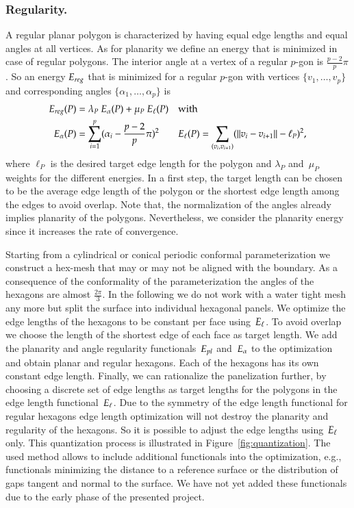 \documentclass[Thesis.tex]{subfiles}
\begin{document}
\subsubsection{Regularity.}
A regular planar polygon is characterized by having equal edge lengths
and equal angles at all vertices. As for planarity we define an energy
that is minimized in case of regular polygons. The interior angle at a
vertex of a regular $p$-gon is $\tfrac{p-2}{p} \pi$. So an energy $E_{reg}$
that is minimized for a regular $p$-gon with vertices $\{v_1, \ldots,
v_p\}$ and corresponding angles $\{\alpha_1, \ldots, \alpha_p\}$ is
\begin{align*}
E_{reg}(P) &= \lambda_P\  E_\alpha(P) + \mu_P\ E_\ell(P) &&\text{with}\\ 
E_\alpha(P) &= \sum_{i=1}^p (\alpha_i - \frac{p-2}{p} \pi)^2 
&& E_\ell(P) = \sum_{(v_i,v_{i+1})} (\|v_i - v_{i+1}\| - \ell_P)^2,
\end{align*}
where $\ell_P$ is the desired target edge length for the polygon and
$\lambda_P$ and~$\mu_P$ weights for the different energies. In a first
step, the target length can be chosen to be the average edge length of
the polygon or the shortest edge length among the edges to avoid
overlap.  Note that, the normalization of the angles already implies
planarity of the polygons.  Nevertheless, we consider the planarity
energy since it increases the rate of convergence.

Starting from a cylindrical or conical periodic conformal
parameterization we construct a hex-mesh that may or may not be
aligned with the boundary. As a consequence of the conformality of the
parameterization the angles of the hexagons are almost
$\tfrac{2\pi}{3}$. In the following we do not work with a water tight
mesh any more but split the surface into individual hexagonal
panels. We optimize the edge lengths of the hexagons to be constant
per face using~$E_\ell$. To avoid overlap we choose the length of the
shortest edge of each face as target length. We add the planarity and
angle regularity functionals~$E_{pl}$ and~$E_\alpha$ to the optimization
and obtain planar and regular hexagons. Each of the hexagons has its
own constant edge length. Finally, we can rationalize the panelization
further, by choosing a discrete set of edge lengths as target lengths
for the polygons in the edge length functional~$E_\ell$. Due to the
symmetry of the edge length functional for regular hexagons edge
length optimization will not destroy the planarity and regularity of
the hexagons. So it is possible to adjust the edge lengths
using~$E_\ell$ only. This quantization process is illustrated in
Figure~\ref{fig:quantization}.
%
The used method allows to include additional functionals into the
optimization, e.g., functionals minimizing the distance to a reference
surface or the distribution of gaps tangent and normal to the
surface. We have not yet added these functionals due to the early
phase of the presented project.
\end{document}
